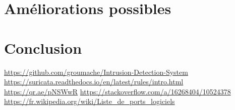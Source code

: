 \documentclass[a4paper]{article}
\begin{document}
\section{Améliorations possibles}













\section{Conclusion}


















\newpage \tableofcontents \listoffigures
\begin{thebibliography}{9}
 {\small \url{https://github.com/groumache/Intrusion-Detection-System}}
 {\small \url{https://suricata.readthedocs.io/en/latest/rules/intro.html}}
 {\small \url{https://qr.ae/pNSWwR}}
 {\small \url{https://stackoverflow.com/a/16268404/10524378}}
 {\small \url{https://fr.wikipedia.org/wiki/Liste_de_ports_logiciels}}
\end{thebibliography}
\end{document}
